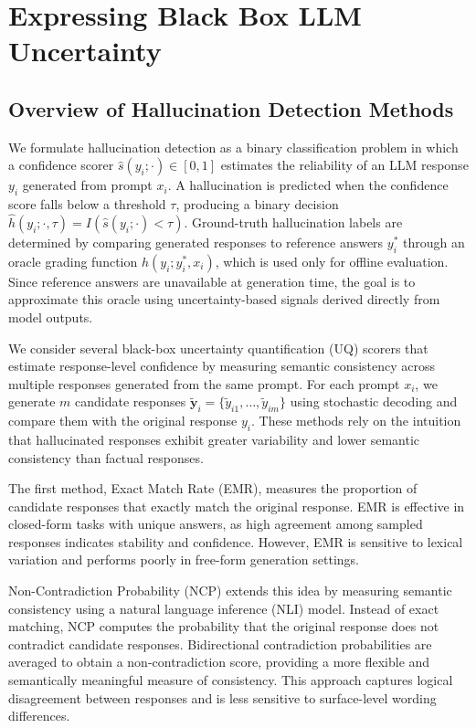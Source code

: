 \section{Expressing Black Box LLM Uncertainty}

\subsection{Overview of Hallucination Detection Methods}

We formulate hallucination detection as a binary classification problem in which a confidence scorer $\hat{s}(y_i; \cdot) \in [0,1]$ estimates the reliability of an LLM response $y_i$ generated from prompt $x_i$. A hallucination is predicted when the confidence score falls below a threshold $\tau$, producing a binary decision $\hat{h}(y_i; \cdot, \tau) = {I}(\hat{s}(y_i; \cdot) < \tau)$. Ground-truth hallucination labels are determined by comparing generated responses to reference answers $y_i^*$ through an oracle grading function $h(y_i; y_i^*, x_i)$, which is used only for offline evaluation. Since reference answers are unavailable at generation time, the goal is to approximate this oracle using uncertainty-based signals derived directly from model outputs.

We consider several black-box uncertainty quantification (UQ) scorers that estimate response-level confidence by measuring semantic consistency across multiple responses generated from the same prompt. For each prompt $x_i$, we generate $m$ candidate responses $\tilde{\mathbf{y}}_i = \{\tilde{y}_{i1}, \ldots, \tilde{y}_{im}\}$ using stochastic decoding and compare them with the original response $y_i$. These methods rely on the intuition that hallucinated responses exhibit greater variability and lower semantic consistency than factual responses.

The first method, Exact Match Rate (EMR), measures the proportion of candidate responses that exactly match the original response. EMR is effective in closed-form tasks with unique answers, as high agreement among sampled responses indicates stability and confidence. However, EMR is sensitive to lexical variation and performs poorly in free-form generation settings.

Non-Contradiction Probability (NCP) extends this idea by measuring semantic consistency using a natural language inference (NLI) model. Instead of exact matching, NCP computes the probability that the original response does not contradict candidate responses. Bidirectional contradiction probabilities are averaged to obtain a non-contradiction score, providing a more flexible and semantically meaningful measure of consistency. This approach captures logical disagreement between responses and is less sensitive to surface-level wording differences.

